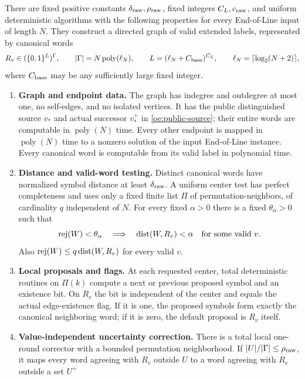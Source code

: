 \begin{theorem}\label{thm:outer-representation}
There are fixed positive constants $\delta_{\rm raw},\rho_{\rm raw}$,
fixed integers $C_L,c_{\rm raw}$, and uniform deterministic algorithms
with the following properties for every End-of-Line input of length $N$.
They construct a directed graph of valid extended labels, represented by
canonical words
\[
 R_v\in(\{0,1\}^L)^\Gamma,
 \qquad |\Gamma|=N\operatorname{poly}(\ell_N),
 \qquad L=(\ell_N+C_{\rm base})^{C_L},
 \qquad \ell_N=\lceil\log_2(N+2)\rceil,
\]
where $C_{\rm base}$ may be any sufficiently large fixed integer.
\begin{enumerate}[label=\textup{(\roman*)}]
\item \textbf{Graph and endpoint data.} The graph has indegree and
outdegree at most one, no self-edges, and no isolated vertices. It has the
public distinguished source $v_*$ and actual successor $v_*^+$ in
\eqref{oe:public-source}; their entire words are computable in
$\operatorname{poly}(N)$ time. Every other endpoint is mapped in
$\operatorname{poly}(N)$ time to a nonzero solution of the input
End-of-Line instance. Every canonical word is computable from its valid
label in polynomial time.
\item \textbf{Distance and valid-word testing.} Distinct canonical words
have normalized symbol distance at least $\delta_{\rm raw}$. A uniform
center test has perfect completeness and uses only a fixed finite list
$\Pi$ of permutation-neighbors, of cardinality $q$ independent of $N$.
For every fixed $\alpha>0$ there is a fixed $\theta_\alpha>0$ such that
\[
 \operatorname{rej}(W)<\theta_\alpha
 \quad\Longrightarrow\quad
 \operatorname{dist}(W,R_v)<\alpha\quad\hbox{for some valid }v.
\]
Also $\operatorname{rej}(W)\leq q\operatorname{dist}(W,R_v)$ for every valid $v$.
\item \textbf{Local proposals and flags.} At each requested center,
total deterministic routines on $\Pi(k)$ compute a next or previous
proposed symbol and an existence bit. On $R_v$ the bit is independent
of the center and equals the actual edge-existence flag. If it is one,
the proposed symbols form exactly the canonical neighboring word; if it
is zero, the default proposal is $R_v$ itself.
\item \textbf{Value-independent uncertainty correction.} There is a
total local one-round corrector with a bounded permutation neighborhood.
If $|U|/|\Gamma|\leq\rho_{\rm raw}$, it maps every word agreeing with
$R_v$ outside $U$ to a word agreeing with $R_v$ outside a set $U^+$

\end{enumerate}
\end{theorem}

